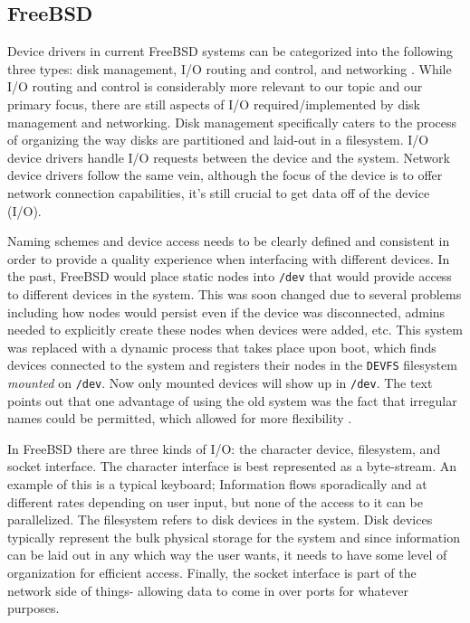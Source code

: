 \documentclass[10pt,draftclsnofoot,onecolumn]{IEEEtran}
\begin{document}
\subsection{FreeBSD}
\label{sub:Devices FreeBSD}
\par Device drivers in current FreeBSD systems can be categorized into the following three types: disk management, I/O routing and control, and networking \cite{bsd:1}.
While I/O routing and control is considerably more relevant to our topic and our primary focus, there are still aspects of I/O required/implemented by disk management and networking.
Disk management specifically caters to the process of organizing the way disks are partitioned and laid-out in a filesystem.
I/O device drivers handle I/O requests between the device and the system.
Network device drivers follow the same vein, although the focus of the device is to offer network connection capabilities, it's still crucial to get data off of the device (I/O).

\par Naming schemes and device access needs to be clearly defined and consistent in order to provide a quality experience when interfacing with different devices.
In the past, FreeBSD would place static nodes into \texttt{/dev} that would provide access to different devices in the system.
This was soon changed due to several problems including how nodes would persist even if the device was disconnected, admins needed to explicitly create these nodes when devices were added, etc.
This system was replaced with a dynamic process that takes place upon boot, which finds devices connected to the system and registers their nodes in the \texttt{DEVFS} filesystem \textit{mounted} on \texttt{/dev}.
Now only mounted devices will show up in \texttt{/dev}.
The text points out that one advantage of using the old system was the fact that irregular names could be permitted, which allowed for more flexibility \cite{bsd:1}.

\par In FreeBSD there are three kinds of I/O: the character device, filesystem, and socket interface.
The character interface is best represented as a byte-stream.
An example of this is a typical keyboard; Information flows sporadically and at different rates depending on user input, but none of the access to it can be parallelized.
The filesystem refers to disk devices in the system.
Disk devices typically represent the bulk physical storage for the system and since information can be laid out in any which way the user wants, it needs to have some level of organization for efficient access.
Finally, the socket interface is part of the network side of things- allowing data to come in over ports for whatever purposes.
\end{document}
